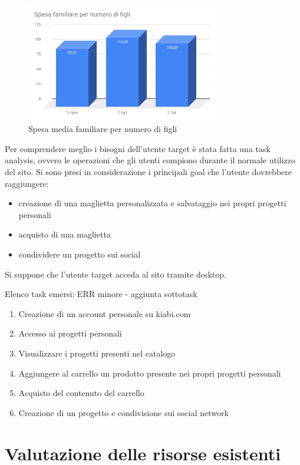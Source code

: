 \documentclass[12pt,italian,]{report}
\begin{document}
\begin{figure}[h]
\centering
\includegraphics[width=0.75\textwidth]{img/Spesa_familiare_per_numero_di_figli.png}
\caption{Spesa media familiare per numero di figli}
\label{spesa_media_n_figli}
\end{figure}

Per comprendere meglio i bisogni dell'utente target è stata fatta una task analysis, ovvero le operazioni che gli utenti compiono durante il normale utilizzo del sito. Si sono presi in considerazione i principali goal che l'utente dovrebbere raggiungere:
\begin{itemize}
\item creazione di una maglietta personalizzata e salvataggio nei propri progetti personali
\item acquisto di una maglietta
\item condividere un progetto sui social
\end{itemize}

Si suppone che l'utente target acceda al sito tramite desktop.

Elenco task emersi: ERR minore - aggiunta sottotask
\begin{enumerate}
\item Creazione di un account personale su kiabi.com
\item Accesso ai progetti personali
\item Visualizzare i progetti presenti nel catalogo
\item Aggiungere al carrello un prodotto presente nei propri progetti personali
\item Acquisto del contenuto del carrello
\item Creazione di un progetto e condivisione sui social network 
\end{enumerate}

\chapter{Valutazione delle risorse
esistenti}\label{valutazione-delle-risorse-esistenti}
\end{document}

